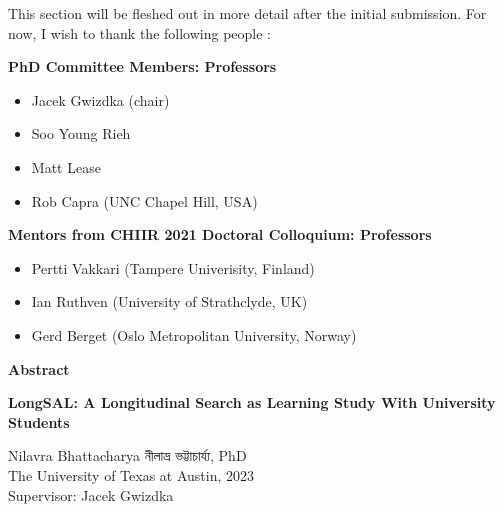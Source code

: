 \documentclass[letterpaper, nobind]{templates/ociamthesis}
\providecommand{\tightlist}{%
  \setlength{\itemsep}{0pt}\setlength{\parskip}{0pt}}
\begin{document}
\begin{romanpages}
\begin{acknowledgements}
 This section will be fleshed out in more detail after the initial submission. For now, I wish to thank the following people :

 \textbf{PhD Committee Members: Professors }

 \begin{itemize}
 \tightlist
 \item
   Jacek Gwizdka (chair)
 \item
   Soo Young Rieh
 \item
   Matt Lease
 \item
   Rob Capra (UNC Chapel Hill, USA)
 \end{itemize}

 \textbf{Mentors from CHIIR 2021 Doctoral Colloquium: Professors }

 \begin{itemize}
 \tightlist
 \item
   Pertti Vakkari (Tampere Univerisity, Finland)
 \item
   Ian Ruthven (University of Strathclyde, UK)
 \item
   Gerd Berget (Oslo Metropolitan University, Norway)
 \end{itemize}
\end{acknowledgements}






\begin{center}
  \textbf{Abstract}\\
  
  \vspace{18pt}
  
  \begin{spacing}{2}
    {\Large{\textbf{LongSAL: A Longitudinal Search as Learning Study With University Students}}}
  \end{spacing}

  \vspace{18pt}

  \begin{spacing}{1.4}
    Nilavra Bhattacharya 
    {\secondlanguage নীলাভ্র ভট্টাচার্য্য}, 
    PhD\\
    The University of Texas at Austin, 
    2023\\
    \vspace{18pt}
    Supervisor: Jacek Gwizdka
  \end{spacing}


\end{center}
\end{romanpages}
\end{document}
